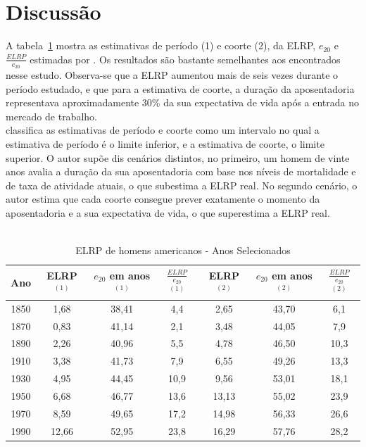 \documentclass[12pt, 						%
			openright, 					%
			twoside,					%
			a4paper,x					%
			english,					%
			brazil]{abntex2}				%
\begin{document}
	\section{Discussão \label{sec4.4}}
	A tabela~\ref{tab3} mostra as estimativas de período (1) e coorte (2), da ELRP, $e_{20}$ e $\tfrac{ELRP}{e_{20}}$ estimadas por . Os resultados são bastante semelhantes aos encontrados nesse estudo. Observa-se que a ELRP aumentou mais de seis vezes durante o período estudado, e que para a estimativa de coorte, a duração da aposentadoria representava aproximadamente 30\% da sua expectativa de vida após a entrada no mercado de trabalho. \\
	 classifica as estimativas de período e coorte como um intervalo no qual a estimativa de período é o limite inferior, e a estimativa de coorte, o limite superior. O autor supõe dis cenários distintos, no primeiro, um homem de vinte anos avalia a duração da sua aposentadoria com base nos níveis de mortalidade e de taxa de atividade atuais, o que subestima a ELRP real. No segundo cenário, o autor estima que cada coorte consegue prever exatamente o momento da aposentadoria e a sua expectativa de vida, o que superestima a ELRP real. \\
	\\ %
	\begin{table}[htb]
	\centering
		\caption{ELRP de homens americanos - Anos Selecionados}
		\label{tab3}
		\begin{tabular}{ccccccc}
		\toprule
		Ano & ELRP$^{(1)}$ & $e_{20}$ em anos$^{(1)}$ & $\frac{ELRP}{e_{20}}$$^{(1)}$ & ELRP$^{(2)}$ & $e_{20}$ em anos$^{(2)}$ & $\frac{ELRP}{e_{20}}$$^{(2)}$\\
		\midrule \midrule
		1850 & 1,68 & 38,41 & 4,4 & 2,65 & 43,70 & 6,1		
		\\		1870 & 0,83 & 41,14 & 2,1 & 3,48 & 44,05 & 7,9 		
		\\		1890 & 2,26 & 40,96 & 5,5 & 4,78 & 46,50 & 10,3 		
		\\		1910 & 3,38 & 41,73 & 7,9 & 6,55 & 49,26 & 13,3 		
		\\		1930 & 4,95 & 44,45 & 10,9 & 9,56 & 53,01 & 18,1 		
		\\		1950 & 6,68 & 46,77 & 13,6 & 13,13 & 55,02 & 23,9 		
		\\		1970 & 8,59 & 49,65 & 17,2 & 14,98 & 56,33 & 26,6 		
		\\		1990 & 12,66 & 52,95 & 23,8 & 16,29 & 57,76 & 28,2 	
		\\ \bottomrule
		\end{tabular}
	\end{table} \\
\end{document}
